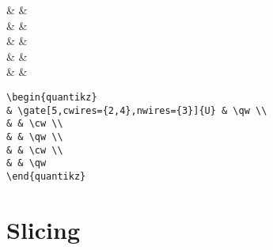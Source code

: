 \documentclass[aps,pra,10pt,nofootinbib]{revtex4}
\begin{document}
\begin{Code}
\begin{center}
\begin{quantikz}
&  & \qw \\
& & \cw \\
& & \qw \\
& & \cw \\
& & \qw
\end{quantikz}
\end{center}
\tcblower
\begin{lstlisting}
\begin{quantikz}
& \gate[5,cwires={2,4},nwires={3}]{U} & \qw \\
& & \cw \\
& & \qw \\
& & \cw \\
& & \qw
\end{quantikz}
\end{lstlisting}
\end{Code}

\section{Slicing}
\end{document}
